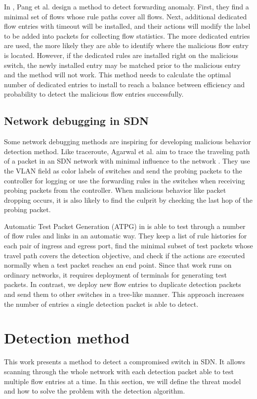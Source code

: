 \documentclass[conference]{IEEEtran}
\begin{document}
In \cite{PJL16}, Pang et al. design a method to detect forwarding anomaly. First, they find a minimal set of flows whose rule paths cover all flows. Next, additional dedicated flow entries with timeout will be installed, and their actions will modify the label to be added into packets for collecting flow statistics. The more dedicated entries are used, the more likely they are able to identify where the malicious flow entry is located. However, if the dedicated rules are installed right on the malicious switch, the newly installed entry may be matched prior to the malicious entry and the method will not work. This method needs to calculate the optimal number of dedicated entries to install to reach a balance between efficiency and probability to detect the malicious flow entries successfully.

\subsection{Network debugging in SDN}
Some network debugging methods are inspiring for developing malicious behavior detection method. Like traceroute, Agarwal et al. aim to trace the traveling path of a packet in an SDN network with minimal influence to the network \cite{ARDC14}. They use the VLAN field as color labels of switches and send the probing packets to the controller for logging or use the forwarding rules in the switches when receiving probing packets from the controller. When malicious behavior like packet dropping occurs, it is also likely to find the culprit by checking the last hop of the probing packet.

Automatic Test Packet Generation (ATPG) in \cite{ZKVM12} is able to test through a number of flow rules and links in an automatic way. They keep a list of rule histories for each pair of ingress and egress port, find the minimal subset of test packets whose travel path covers the detection objective, and check if the actions are executed normally when a test packet reaches an end point. Since that work runs on ordinary networks, it requires deployment of terminals for generating test packets. In contrast, we deploy new flow entries to duplicate detection packets and send them to other switches in a tree-like manner. This approach increases the number of entries a single detection packet is able to detect. 

\section{Detection method}
This work presents a method to detect a compromised switch in SDN. It allows scanning through the whole network with each detection packet able to test multiple flow entries at a time. In this section, we will define the threat model and how to solve the problem with the detection algorithm.
\end{document}
